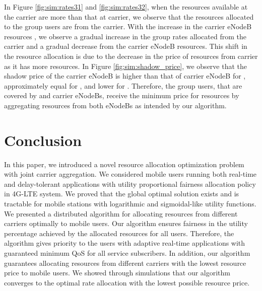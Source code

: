\documentclass[conference]{IEEEtran}
\begin{document}
In Figure \ref{fig:sim:rates31} and \ref{fig:sim:rates32}, when the resources available at the  carrier are more than that at  carrier, we observe that the resources allocated to the  group users are from the  carrier. With the increase in the  carrier eNodeB resources , we observe a gradual increase in the  group rates allocated from the  carrier and a gradual decrease from the  carrier eNodeB resources. This shift in the resource allocation is due to the decrease in the price of resources from  carrier as it has more resources. In Figure \ref{fig:sim:shadow_price}, we observe that the shadow price of the  carrier eNodeB is higher than that of  carrier eNodeB for , approximately equal for , and lower for . Therefore, the  group users, that are covered by  and  carrier eNodeBs, receive the minimum price for resources by aggregating resources from both 
eNodeBs as intended by our algorithm.
\section{Conclusion}\label{sec:conclude}
In this paper, we introduced a novel resource allocation optimization problem with joint carrier aggregation. We considered mobile users running both real-time and delay-tolerant applications with utility proportional fairness allocation policy in 4G-LTE system. We proved that the global optimal solution exists and is tractable for mobile stations with logarithmic and sigmoidal-like utility functions. We presented a distributed algorithm for allocating resources from different carriers optimally to mobile users. Our algorithm ensures fairness in the utility percentage achieved by the allocated resources for all users. Therefore, the algorithm gives priority to the users with adaptive real-time applications with guaranteed minimum QoS for all service subscribers. In addition, our algorithm guarantees allocating resources from different carriers with the lowest resource price to mobile users. We showed through simulations that our algorithm converges to the optimal rate allocation with the lowest possible 
resource price.



\end{document}
